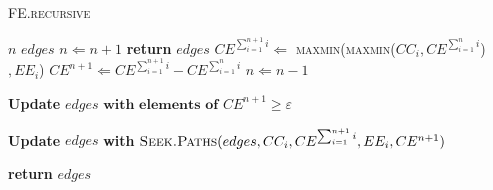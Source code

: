 \begin{algorithm}
\begin{algorithmic}[1]
\caption{\textsc{FE.recursive}}
\label{FE.recursive}
\Variables
 \State $n$
 \State $edges$
\EndVariables
{}
\State $n \Leftarrow n + 1$
    \State \textbf{return} $edges$ 
\EndIf
    \State $CE^{\sum_{i=1}^{n+1}{i}} \Leftarrow$ \textsc{maxmin}(\textsc{maxmin}($CC_{i},CE^{\sum_{i=1}^n{i}}$)$,EE_{i}$)
    \State $CE^{n+1} \Leftarrow CE^{\sum_{i=1}^{n+1}{i}} - CE^{\sum_{i=1}^n{i}}$
    \State {}
    \State $n \Leftarrow n - 1$
    
    \State \textbf{Update} $edges \textbf{ with elements of } CE^{n+1} \geq \varepsilon$
    
    \State \textbf{Update} $edges$ \textbf{with} $\Call{Seek.Paths}{edges, CC_{i}, CE^{\sum_{i=1}^{n+1}{i}}, EE_{i}, CE^{n+1}}$

\State \textbf{return} $edges$
\EndProcedure
\end{algorithmic}
\end{algorithm}

